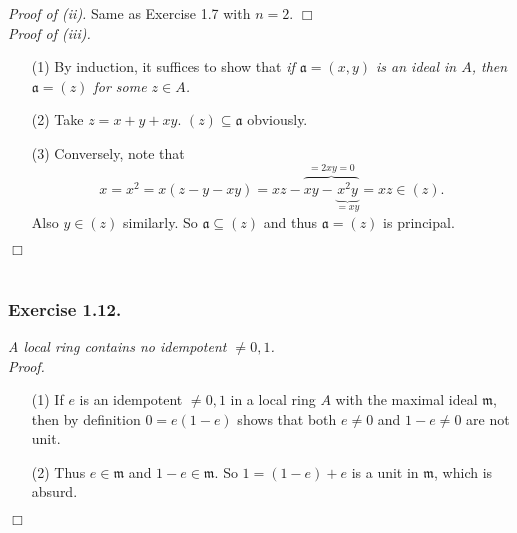 \documentclass{article}
\begin{document}
\emph{Proof of (ii).}
  Same as Exercise 1.7 with $n = 2$.
$\Box$ \\



\emph{Proof of (iii).}
\begin{enumerate}
\item[(1)]
  By induction, it suffices to show that \emph{if $\mathfrak{a} = (x,y)$ is an ideal in $A$,
  then $\mathfrak{a} = (z)$ for some $z \in A$.}

\item[(2)]
  Take $z = x+y+xy$. $(z) \subseteq \mathfrak{a}$ obviously.

\item[(3)]
  Conversely, note that
  \[
    x
    = x^2
    = x(z-y-xy)
    = xz - \overbrace{xy - \underbrace{x^2y}_{=xy}}^{= 2xy = 0}
    = xz \in (z).
  \]
  Also $y \in (z)$ similarly.
  So $\mathfrak{a} \subseteq (z)$ and thus $\mathfrak{a} = (z)$ is principal.
\end{enumerate}
$\Box$ \\\\






\subsubsection*{Exercise 1.12.}
\emph{A local ring contains no idempotent $\neq 0, 1$.} \\



\emph{Proof.}
\begin{enumerate}
\item[(1)]
  If $e$ is an idempotent $\neq 0, 1$ in a local ring $A$ with the maximal ideal $\mathfrak{m}$,
  then by definition $0 = e(1-e)$ shows that both $e \neq 0$ and $1-e \neq 0$ are not unit.

\item[(2)]
  Thus $e \in \mathfrak{m}$ and $1-e \in \mathfrak{m}$.
  So $1 = (1-e) + e$ is a unit in $\mathfrak{m}$, which is absurd.
\end{enumerate}
$\Box$ \\\\



\end{document}
